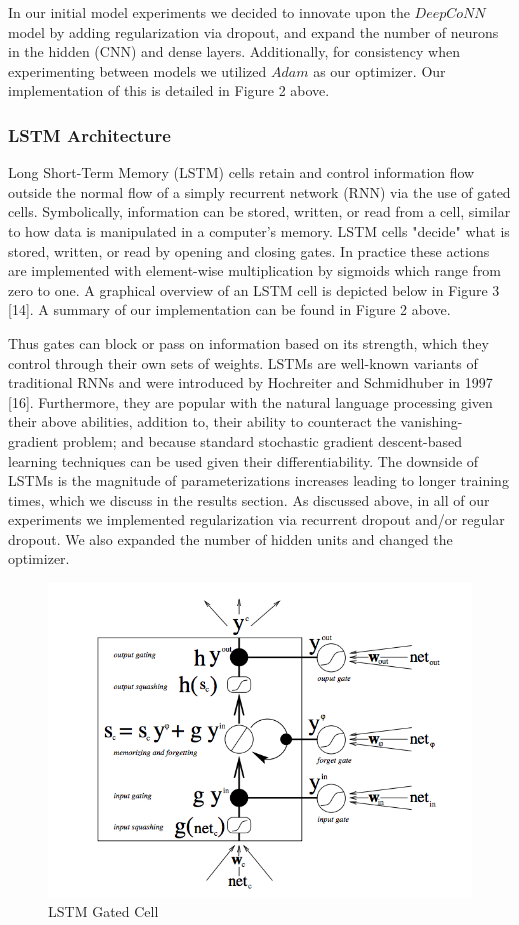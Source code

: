 \documentclass[10pt,twocolumn,letterpaper]{article}
\begin{document}
In our initial model experiments we decided to innovate upon the $DeepCoNN$ model by adding regularization via dropout, and expand the number of neurons in the hidden (CNN) and dense layers. Additionally, for consistency when experimenting between models we utilized $Adam$ as our optimizer. Our implementation of this is detailed in Figure 2 above.

\subsubsection{LSTM Architecture}
Long Short-Term Memory (LSTM) cells retain and control information flow outside the normal flow of a simply recurrent network (RNN) via the use of gated cells. Symbolically, information can be stored, written, or read from a cell, similar to how data is manipulated in a computer’s memory. LSTM cells "decide" what is stored, written, or read by opening and closing gates. In practice these actions are implemented with element-wise multiplication by sigmoids which range from zero to one. A graphical overview of an LSTM cell is depicted below in Figure 3 [14]. A summary of our implementation can be found in Figure 2 above.

Thus gates can block or pass on information based on its strength, which they control through their own sets of weights. LSTMs are well-known variants of traditional RNNs and were introduced by Hochreiter and Schmidhuber in 1997 [16]. Furthermore, they are popular with the natural language processing given their above abilities, addition to, their ability to counteract the vanishing-gradient problem; and because standard stochastic gradient descent-based learning techniques can be used given their differentiability. The downside of LSTMs is the magnitude of parameterizations increases leading to longer training times, which we discuss in the results section. As discussed above, in all of our experiments we implemented regularization via recurrent dropout and/or regular dropout. We also expanded the number of hidden units and changed the optimizer.  

\begin{figure}[!ht]
\includegraphics[scale=0.38]{LSTM.png}
\caption{LSTM Gated Cell}
\end{figure}
\end{document}
